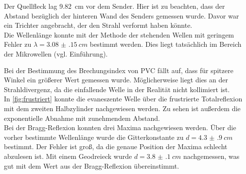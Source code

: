 Der Quellfleck lag \SI{9.82}{cm} vor dem Sender. Hier ist zu beachten, dass der Abstand bezüglich der hinteren Wand des Senders gemessen wurde. Davor war ein Trichter angebracht, der den Strahl verformt haben könnte.\\

Die Wellenlänge konnte mit der Methode der stehenden Wellen mit geringem Fehler zu $\lambda=\SI{3.08(15)}{cm}$ bestimmt werden. Dies liegt tatsächlich im Bereich der Mikrowellen (vgl. Einführung).

Bei der Bestimmung des Brechungsindex von PVC fällt auf, dass für spitzere Winkel ein größerer Wert gemessen wurde. Möglicherweise liegt dies an der Strahldivergenz, da die einfallende Welle in der Realität nicht kollimiert ist.\\

In \cref{fig:frustriert} konnte die evaneszente Welle über die frustrierte Totalreflexion mit dem zweiten Halbzylinder nachgewiesen werden. Zu sehen ist außerdem die exponentielle Abnahme mit zunehmendem Abstand.\\

Bei der Bragg-Reflexion konnten drei Maxima nachgewiesen werden. Über die vorher bestimmte Wellenlänge wurde die Gitterkonstante zu $d=\SI{4.3(9)}{cm}$ bestimmt. Der Fehler ist groß, da die genaue Position der Maxima schlecht abzulesen ist. Mit einem Geodreieck wurde $d=\SI{3.8(1)}{cm}$ nachgemessen, was gut mit dem Wert aus der Bragg-Reflexion übereinstimmt.

\nocite{anleitung-ss2015}